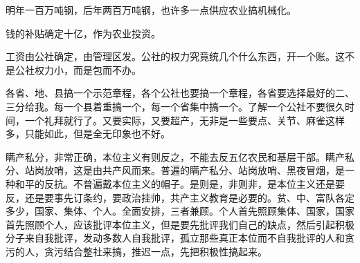 明年一百万吨钢，后年两百万吨钢，也许多一点供应农业搞机械化。

钱的补贴确定十亿，作为农业投资。

工资由公社确定，由管理区发。公社的权力究竟统几个什么东西，开一个账。这不是公社权力小，而是包而不办。

各省、地、县搞一个示范章程，各个公社也要搞一个章程，各省要选择最好的二、三分给我。每一个县着重搞一个，每一个省集中搞一个。了解一个公社不要很久时间，一个礼拜就行了。又要实际，又要超产，无非是一些要点、关节、麻雀这样多，只能如此，但是全无印象也不好。

瞒产私分，非常正确，本位主义有则反之，不能去反五亿农民和基层干部。瞒产私分、站岗放哨，这是由共产风而来。普遍的瞒产私分、站岗放哨、黑夜冒烟，是一种和平的反抗。不普遍戴本位主义的帽子。是则是，非则非，是本位主义还是要反，还是要事先订条约，要政治挂帅，共产主义教育是必要的。贫、中、富队各定多少，国家、集体、个人。全面安排，三者兼顾。个人首先照顾集体、国家，国家首先照顾个人，应该批评本位主义，但是要先批评我们自己的缺点，然后引起积极分子来自我批评，发动多数人自我批评，孤立那些真正本位而不自我批评的人和贪污的人，贪污结合整社来搞，推迟一点，先把积极性搞起来。


